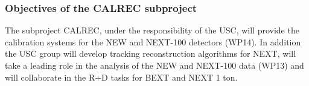 %
%

\subsubsection*{Objectives of the CALREC subproject}

The subproject CALREC, under the responsibility of the USC, will provide the calibration systems for the NEW and NEXT-100 detectors (WP14).
In addition the USC group will develop tracking reconstruction algorithms for NEXT, will
take a leading role in the analysis of the NEW and NEXT-100 data (WP13) and will collaborate  in the R+D tasks for BEXT and NEXT 1 ton. 

